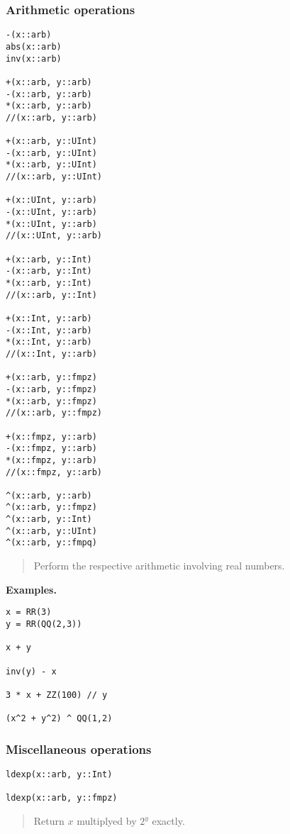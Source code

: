 \documentclass[a4paper,10pt]{article}
\newcommand{\desc}[1]{\vspace{-3mm}\begin{quote}#1\end{quote}}
\begin{document}
{{\begin{lstlisting}
\end{lstlisting}

\subsubsection{Arithmetic operations}

\begin{lstlisting}
-(x::arb)
abs(x::arb)
inv(x::arb)

+(x::arb, y::arb)
-(x::arb, y::arb)
*(x::arb, y::arb)
//(x::arb, y::arb)

+(x::arb, y::UInt)
-(x::arb, y::UInt)
*(x::arb, y::UInt)
//(x::arb, y::UInt)

+(x::UInt, y::arb)
-(x::UInt, y::arb)
*(x::UInt, y::arb)
//(x::UInt, y::arb)

+(x::arb, y::Int)
-(x::arb, y::Int)
*(x::arb, y::Int)
//(x::arb, y::Int)

+(x::Int, y::arb)
-(x::Int, y::arb)
*(x::Int, y::arb)
//(x::Int, y::arb)

+(x::arb, y::fmpz)
-(x::arb, y::fmpz)
*(x::arb, y::fmpz)
//(x::arb, y::fmpz)

+(x::fmpz, y::arb)
-(x::fmpz, y::arb)
*(x::fmpz, y::arb)
//(x::fmpz, y::arb)

^(x::arb, y::arb)
^(x::arb, y::fmpz)
^(x::arb, y::Int)
^(x::arb, y::UInt)
^(x::arb, y::fmpq)
\end{lstlisting}

\desc{Perform the respective arithmetic involving real numbers.}

\textbf{Examples.}

\begin{lstlisting}
x = RR(3)
y = RR(QQ(2,3))

x + y

inv(y) - x

3 * x + ZZ(100) // y

(x^2 + y^2) ^ QQ(1,2)
\end{lstlisting}

\subsubsection{Miscellaneous operations}

\begin{lstlisting}
ldexp(x::arb, y::Int)

ldexp(x::arb, y::fmpz)
\end{lstlisting}

\desc{Return $x$ multiplyed by $2^y$ exactly.}

}}
\end{document}
